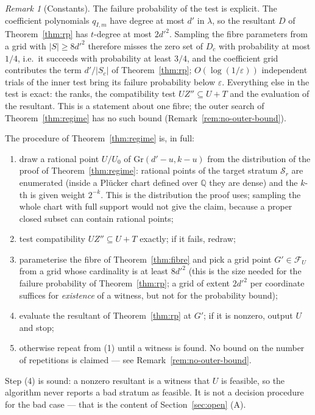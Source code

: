 \documentclass[journal]{IEEEtran}
\theoremstyle{plainn}
\theoremstyle{remark}
\newtheorem{remark}[thm]{Remark}
\begin{document}
\begin{remark}[Constants]\label{rem:constants}
The failure probability of the test is explicit. The coefficient polynomials $q_{I,m}$ have degree at
most $d'$ in $\lambda$, so the resultant $D$ of Theorem~\ref{thm:rp} has $t$-degree at most
$2d'^{2}$. Sampling the fibre parameters from a grid with $|S|\ge8d'^{2}$ therefore misses the zero set of $D_{c}$
with probability at most $1/4$, i.e.\ it succeeds with probability at least $3/4$, and the coefficient grid contributes the term
$d'/|S_c|$ of Theorem~\ref{thm:rp}; $O(\log(1/\varepsilon))$ independent trials of the inner test
bring its failure probability below $\varepsilon$. Everything else in the test is exact: the ranks,
the compatibility test $UZ''\subseteq U+T$ and the evaluation of the resultant. This is a statement
about one fibre; the outer search of Theorem~\ref{thm:regime} has no such bound
(Remark~\ref{rem:no-outer-bound}).
\end{remark}

The procedure of Theorem~\ref{thm:regime} is, in full:
\begin{enumerate}[label=\textup{(\arabic*)},leftmargin=2.2em,itemsep=1pt]
\item draw a rational point $U/U_0$ of $\mathrm{Gr}(d'-u,k-u)$ from the distribution of the proof of
Theorem~\ref{thm:regime}: rational points of the target stratum $\mathcal S_r$ are enumerated (inside a
Plücker chart defined over $\mathbb Q$ they are dense) and the $k$-th is given weight $2^{-k}$. This is
the distribution the proof uses; sampling the whole chart with full support would not give the claim,
because a proper closed subset can contain rational points;
\item test compatibility $UZ''\subseteq U+T$ exactly; if it fails, redraw;
\item parameterise the fibre of Theorem~\ref{thm:fibre} and pick a grid point $G'\in\mathcal F_U$ from a
grid whose cardinality is at least $8d'^{2}$ (this is the size needed for the failure probability of
Theorem~\ref{thm:rp}; a grid of extent $2d'^{2}$ per coordinate suffices for \emph{existence} of a
witness, but not for the probability bound);
\item evaluate the resultant of Theorem~\ref{thm:rp} at $G'$; if it is nonzero, output $U$ and stop;
\item otherwise repeat from (1) until a witness is found. No bound on the number of repetitions is
claimed --- see Remark~\ref{rem:no-outer-bound}.
\end{enumerate}
Step (4) is sound: a nonzero resultant is a witness that $U$ is feasible, so the algorithm never
reports a bad stratum as feasible. It is not a decision procedure for the bad case --- that is the
content of Section~\ref{sec:open} (A).
\end{document}
